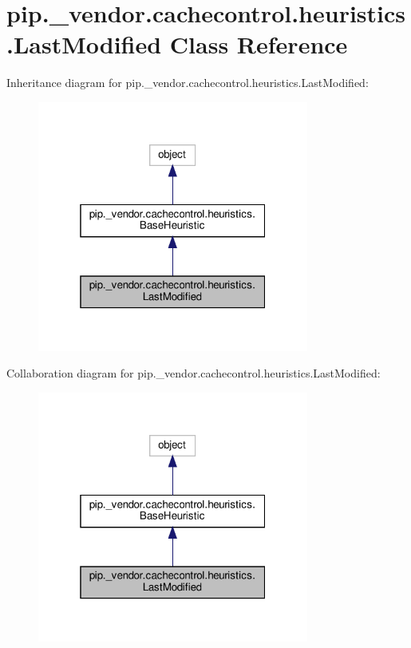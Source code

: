 \hypertarget{classpip_1_1__vendor_1_1cachecontrol_1_1heuristics_1_1LastModified}{}\section{pip.\+\_\+vendor.\+cachecontrol.\+heuristics.\+Last\+Modified Class Reference}
\label{classpip_1_1__vendor_1_1cachecontrol_1_1heuristics_1_1LastModified}


Inheritance diagram for pip.\+\_\+vendor.\+cachecontrol.\+heuristics.\+Last\+Modified\+:
\nopagebreak
\begin{figure}[H]
\begin{center}
\leavevmode
\includegraphics[width=253pt]{classpip_1_1__vendor_1_1cachecontrol_1_1heuristics_1_1LastModified__inherit__graph}
\end{center}
\end{figure}


Collaboration diagram for pip.\+\_\+vendor.\+cachecontrol.\+heuristics.\+Last\+Modified\+:
\nopagebreak
\begin{figure}[H]
\begin{center}
\leavevmode
\includegraphics[width=253pt]{classpip_1_1__vendor_1_1cachecontrol_1_1heuristics_1_1LastModified__coll__graph}
\end{center}
\end{figure}
